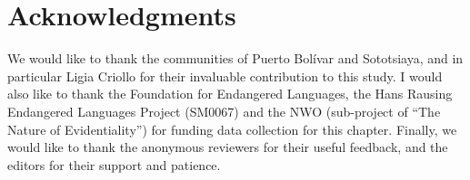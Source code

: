 \documentclass[output=paper]{langscibook}
\begin{document}

\section*{Acknowledgments}
We would like to thank the communities of Puerto Bolívar and Sototsiaya, and in particular Ligia Criollo for their invaluable contribution to this study. I would also like to thank the Foundation for Endangered Languages, the Hans Rausing Endangered Languages Project (SM0067) and the NWO (sub-project of “The Nature of Evidentiality”) for funding data collection for this chapter. Finally, we would like to thank the anonymous reviewers for their useful feedback, and the editors for their support and patience.


\printbibliography[heading=subbibliography,notkeyword=this]
\end{document}
